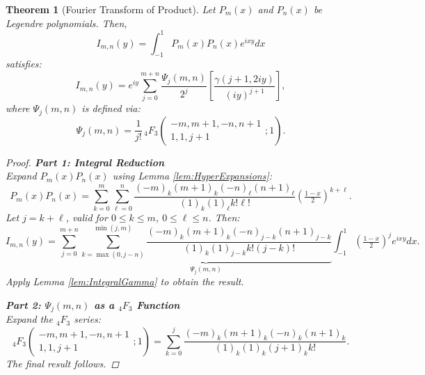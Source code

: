 \documentclass[12pt]{article}
\newtheorem{theorem}{Theorem}
\begin{document}
\begin{theorem}[Fourier Transform of Product]\label{thm:MainResult}
Let \( P_m(x) \) and \( P_n(x) \) be Legendre polynomials. Then,
\[
I_{m,n}(y) = \int_{-1}^1 P_m(x)P_n(x)e^{ixy}dx
\]
satisfies:
\[
I_{m,n}(y) = e^{iy}\sum_{j=0}^{m+n}\frac{\Psi_j(m,n)}{2^j}\left[\frac{\gamma(j+1,2iy)}{(iy)^{j+1}}\right],
\]
where \( \Psi_j(m,n) \) is defined via:
\[
\Psi_j(m,n) = \frac{1}{j!}\,{}_4F_3\left(\begin{array}{c} -m, m+1, -n, n+1 \\ 1, 1, j+1 \end{array};1\right).
\]

\begin{proof}
\textbf{Part 1: Integral Reduction}\\
Expand \( P_m(x)P_n(x) \) using Lemma \ref{lem:HyperExpansions}:
\[
P_m(x)P_n(x) = \sum_{k=0}^m \sum_{\ell=0}^n \frac{(-m)_k(m+1)_k(-n)_\ell(n+1)_\ell}{(1)_k(1)_\ell k! \ell!}\left(\tfrac{1-x}{2}\right)^{k+\ell}.
\]
Let \( j = k + \ell \), valid for \( 0 \leq k \leq m \), \( 0 \leq \ell \leq n \). Then:
\[
I_{m,n}(y) = \sum_{j=0}^{m+n} \underbrace{\sum_{k=\max(0,j-n)}^{\min(j,m)} \frac{(-m)_k(m+1)_k(-n)_{j-k}(n+1)_{j-k}}{(1)_k(1)_{j-k}k!(j-k)!}}_{\Psi_j(m,n)} \int_{-1}^1 \left(\tfrac{1-x}{2}\right)^j e^{ixy}dx.
\]
Apply Lemma \ref{lem:IntegralGamma} to obtain the result.

\medskip

\textbf{Part 2: \( \Psi_j(m,n) \) as a \( {}_4F_3 \) Function}\\
Expand the \( {}_4F_3 \) series:
\[
{}_4F_3\left(\begin{array}{c} -m, m+1, -n, n+1 \\ 1, 1, j+1 \end{array};1\right) = \sum_{k=0}^j \frac{(-m)_k(m+1)_k(-n)_k(n+1)_k}{(1)_k(1)_k(j+1)_k k!}.
\]
The final result follows. \qedhere
\end{proof}
\end{theorem}
\end{document}
